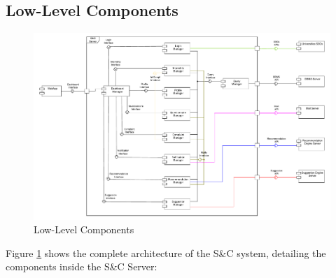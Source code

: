 \subsection{Low-Level Components}
\label{sub:low-level-components}

\begin{figure}[H]
    \centering
    \includegraphics[width=1.0\textwidth]{Images/Low_Level_Architectural_Design.pdf}
    \caption{Low-Level Components}
    \label{fig:low-level-components}
\end{figure}

\par Figure \ref{fig:low-level-components} shows the complete architecture of the S\&C system, detailing the components inside the S\&C Server:

